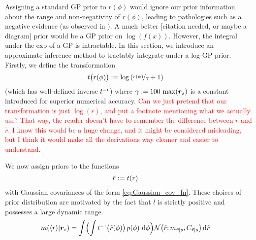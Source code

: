 \documentclass{article}
\begin{document}
Assigning a standard GP prior to $r(\phi)$ would ignore our prior information about the range and non-negativity of $r(\phi)$, leading to pathologies such as a negative evidence (as observed in \citep{BZMonteCarlo}).  A much better [citation needed, or maybe a diagram] prior would be a GP prior on $\log(f(x))$.  However, the integral under the exp of a GP is intractable.  In this section, we introduce an approximate inference method to tractably integrate under a log-GP prior.
Firstly, we define the transformation
\begin{align*}
t\bigl(r(\phi)\bigr) & \deq \log\left(\nicefrac{r(\phi)}{\gamma} + 1\right)
\end{align*}
(which has well-defined inverse $t\inv$) where 
$
 \gamma \deq 100\, \max(\vr_s)
$
is a constant introduced for superior numerical accuracy. \textcolor{red}{Can we just pretend that our transformation is just $\log(r)$, and put a footnote mentioning what we actually use?  That way, the reader doesn't have to remember the difference between $r$ and $\tilde{r}$.  I know this would be a huge change, and it might be considered misleading, but I think it would make all the derivations way cleaner and easier to understand.}

We now assign \gpb priors to the functions
\begin{align*}
 \tr & \deq  t(r)
\end{align*}
with Gaussian
covariances of the form \eqref{eq:Gaussian_cov_fn}.
These choices of prior distribution are motivated by the fact that
$l$ is strictly positive and possesses a large dynamic
range. 
%
%
\begin{align}
\mean{\inty{r}}{\vr_s}
&  =\int \Bigl( \int t\inv\bigr(\tr(\phi)\bigl)\,\po{\phi}\,\ud\phi\Bigr)
\N{\tr}{\meancondfn{\tr}{s}}{\covcondfn{\tr}{s}} \ud \tr \nonumber
\end{align}
\end{document}
